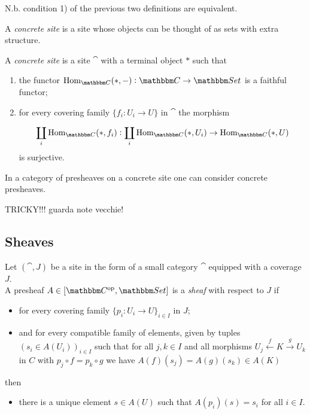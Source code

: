 \documentclass[a4paper,11pt,fleqn]{article}  %
\begin{document}
N.b. condition 1) of the previous two definitions are equivalent.

A \emph{concrete site} is a site whose objects can be thought of as sets with extra structure. 
\begin{definition}
	A \emph{concrete site} is a site $\cat$ with a terminal object $*$ such that
	\begin{enumerate}
		\item the functor $\Hom_{\cat}(*,-) : \cat \to \Set$ is a faithful functor;
		\item for every covering family $\{f_i : U_i \to U\}$ in $\cat$ the morphism 

   $$
     \coprod_i \Hom_{\cat} (*,f_i) : \coprod_i \Hom_{\cat} (*, U_i) \to \Hom_{\cat} (*, U) 
   $$
   is surjective.
	\end{enumerate}
\end{definition}


In a category of presheaves on a concrete site one can consider concrete presheaves.

\begin{definition}
 TRICKY!!! guarda note vecchie!
\end{definition}



\subsection{Sheaves}

\begin{definition}[Sheaf]
Let $(\cat,J)$ be a site in the form of a small category $\cat$ equipped with a coverage $J$.
\\
A presheaf $A \in [\cat^\op,\Set]$ is a \emph{sheaf} with respect to $J$ if
\begin{itemize}
	\item for every covering family $\{p_i : U_i \to U\}_{i \in I}$ in $J$;
	\item and for every compatible family of elements, given by tuples $(s_i \in A(U_i))_{i \in I}$ such that for all $j,k \in I$ and all morphisms $U_j \stackrel{f}{\leftarrow} K \stackrel{g}{\to} U_k$ in $C$ with $p_j \circ f = p_k \circ g$ we have $A(f)(s_j) = A(g)(s_k) \in A(K)$
\end{itemize}
then
\begin{itemize}
	\item there is a  unique  element $s \in A(U)$ such that $A(p_i)(s) = s_i$ for all $i \in I$.
\end{itemize}
\end{definition}
\end{document}

